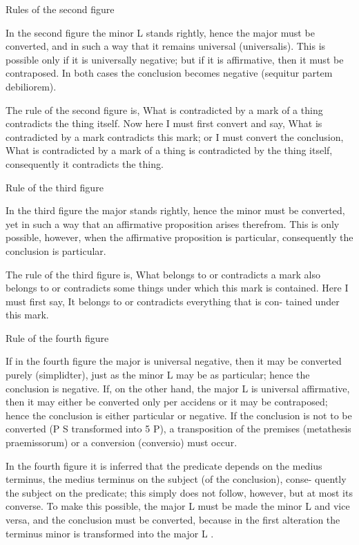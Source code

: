 Rules of the second figure

In the second figure the minor L stands rightly, hence the major must be
converted, and in such a way that it remains universal (universalis).
This is possible only if it is universally negative;
but if it is affirmative, then it must be contraposed.
In both cases the conclusion becomes negative
(sequitur partem debiliorem).

    The rule of the second figure is, What is contradicted by a mark of a thing
    contradicts the thing itself. Now here I must first convert and say, What is
    contradicted by a mark contradicts this mark; or I must convert the conclusion,
    What is contradicted by a mark of a thing is contradicted by the thing itself,
    consequently it contradicts the thing.

Rule of the third figure

In the third figure the major stands rightly, hence the minor must be converted,
yet in such a way that an affirmative proposition arises therefrom.
This is only possible, however, when the affirmative proposition is particular,
consequently the conclusion is particular.

    The rule of the third figure is, What belongs to or contradicts a mark also
    belongs to or contradicts some things under which this mark is contained.
    Here I must first say, It belongs to or contradicts everything that is con-
    tained under this mark.

Rule of the fourth figure

If in the fourth figure the major is universal negative, then it may be
converted purely (simplidter), just as the minor L may be as particular;
hence the conclusion is negative. If, on the other hand, the major L is
universal affirmative, then it may either be converted only per accidens or it
may be contraposed; hence the conclusion is either particular or negative.
If the conclusion is not to be converted (P S transformed into 5 P), a
transposition of the premises (metathesis praemissorum) or a conversion
(conversio) must occur.

    In the fourth figure it is inferred that the predicate depends on the medius
    terminus, the medius terminus on the subject (of the conclusion), conse-
    quently the subject on the predicate; this simply does not follow, however, but
    at most its converse. To make this possible, the major L must be made the
    minor L and vice versa, and the conclusion must be converted, because in the
    first alteration the terminus minor is transformed into the major L .

